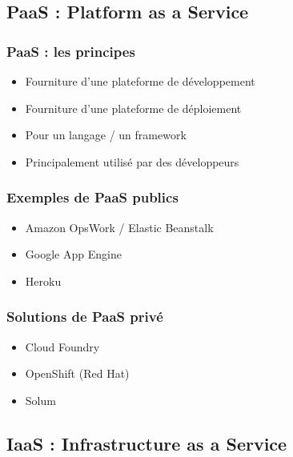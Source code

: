   \subsection[PaaS]{PaaS : Platform as a Service}

  \begin{frame}
    \frametitle{PaaS : les principes}
    \begin{itemize}
      \item Fourniture d'une plateforme de développement
      \item Fourniture d'une plateforme de déploiement
      \item Pour un langage / un framework
      \item Principalement utilisé par des développeurs
    \end{itemize}
  \end{frame}

  \begin{frame}
    \frametitle{Exemples de PaaS publics}
    \begin{itemize}
      \item Amazon OpsWork / Elastic Beanstalk
      \item Google App Engine
      \item Heroku
    \end{itemize}
  \end{frame}

  \begin{frame}
    \frametitle{Solutions de PaaS privé}
    \begin{itemize}
      \item Cloud Foundry
      \item OpenShift (Red Hat)\pause
      \item Solum
    \end{itemize}
  \end{frame}

  \subsection[IaaS]{IaaS : Infrastructure as a Service}

